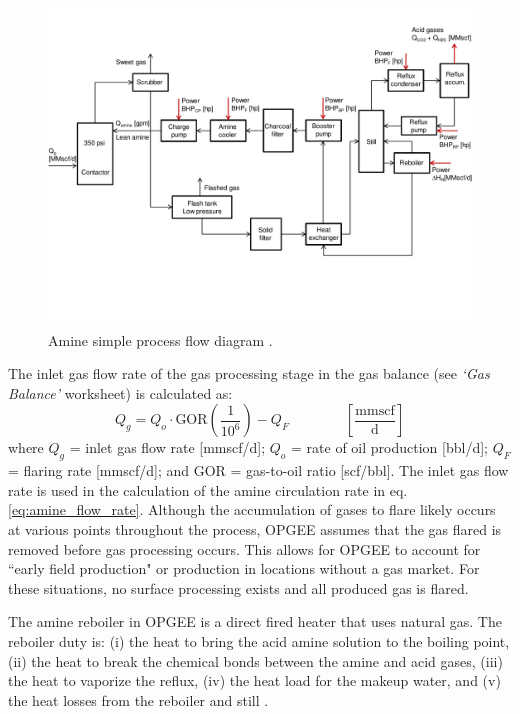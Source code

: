 \documentclass[11pt]{report}
\newcommand{\sheet}[1]{\textit{`{#1}'}}
\newcommand{\eqnunitfrac}[2]{\quad\quad \scriptstyle{\left[\frac{\text{#1}}{\text{#2}}\right]}}
\begin{document}
\begin{landscape}
\begin{figure}[t]
\includegraphics[width=0.85\columnwidth]{images/Amine_process.pdf}
\caption{Amine simple process flow diagram \cite[p. 112]{Manning1991}.}
\label{fig:amine_process}
\end{figure}
\end{landscape}
   

The inlet gas flow rate of the gas processing stage in the gas balance (see \sheet{Gas Balance} worksheet) is calculated as:  
\begin{equation} \label{eq:AGR_inlet_gas}
Q_{g}= Q_{o} \cdot \text{GOR}  \left( \frac{1}{10^6} \right) - Q_{F} \quad\quad\eqnunitfrac{mmscf}{d}
\end{equation}
where $Q_{g}$ = inlet gas flow rate [mmscf/d]; $Q_{o}$ = rate of oil production [bbl/d]; $Q_{F}$ = flaring rate [mmscf/d]; and GOR = gas-to-oil ratio [scf/bbl]. The inlet gas flow rate is used in the calculation of the amine circulation rate in eq.\,\eqref{eq:amine_flow_rate}. Although the accumulation of gases to flare likely occurs at various points throughout the process, OPGEE assumes that the gas flared is removed before gas processing occurs. This allows for OPGEE to account for ``early field production" or production in locations without a gas market. For these situations, no surface processing exists and all produced gas is flared.  

The amine reboiler in OPGEE is a direct fired heater that uses natural gas. The reboiler duty is: (i) the heat to bring the acid amine solution to the boiling point, (ii) the heat to break the chemical bonds between the amine and acid gases, (iii) the heat to vaporize the reflux, (iv) the heat load for the makeup water, and (v) the heat losses from the reboiler and still \cite[p. 117]{Manning1991}.
\end{document}
